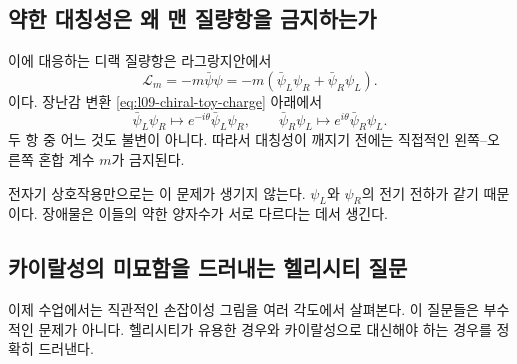 \subsection{약한 대칭성은 왜 맨 질량항을 금지하는가}

이에 대응하는 디랙 질량항은 라그랑지안에서
\begin{equation}
  \mathcal L_m
  =-m\bar\psi\psi
  =-m\left(\bar\psi_L\psi_R+\bar\psi_R\psi_L\right).
  \label{eq:l09-bare-dirac-mass}
\end{equation}
이다. 장난감 변환 \eqref{eq:l09-chiral-toy-charge} 아래에서
\begin{equation}
  \bar\psi_L\psi_R\longmapsto
  e^{-i\theta}\bar\psi_L\psi_R,
  \qquad
  \bar\psi_R\psi_L\longmapsto
  e^{i\theta}\bar\psi_R\psi_L.
\end{equation}
두 항 중 어느 것도 불변이 아니다. 따라서 대칭성이 깨지기 전에는 직접적인 왼쪽--오른쪽 혼합 계수 \(m\)가 금지된다.

전자기 상호작용만으로는 이 문제가 생기지 않는다. \(\psi_L\)와 \(\psi_R\)의 전기 전하가 같기 때문이다. 장애물은 이들의 약한 양자수가 서로 다르다는 데서 생긴다.

\subsection{카이랄성의 미묘함을 드러내는 헬리시티 질문}

이제 수업에서는 직관적인 손잡이성 그림을 여러 각도에서 살펴본다. 이 질문들은 부수적인 문제가 아니다. 헬리시티가 유용한 경우와 카이랄성으로 대신해야 하는 경우를 정확히 드러낸다.

\begin{classroomqa}\end{classroomqa}

\begin{classroomqa}\end{classroomqa}

